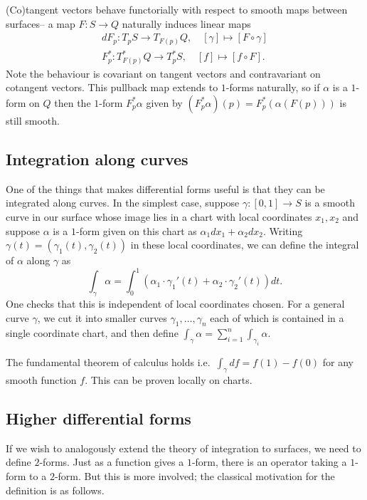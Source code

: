 (Co)tangent vectors behave functorially with respect to smooth maps between
surfaces-- a map \(F:S\to Q\) naturally induces linear maps
\begin{align*}
    dF_p: T_pS \to T_{F(p)}Q, \quad [\gamma] \mapsto [F\circ \gamma] \\
    F_p^\ast:T^\ast_{F(p)}Q \to T^\ast_pS, \quad [f]\mapsto [f\circ F].
\end{align*}
Note the behaviour is covariant on tangent vectors and contravariant on
cotangent vectors. This pullback map extends to \(1\)-forms naturally, so if
\(\alpha\) is a \(1\)-form on \(Q\) then the \(1\)-form \(F_p^\ast \alpha\) given
by \((F_p^\ast\alpha)(p)= F_p^\ast(\alpha(F(p)))\) is still smooth.

\subsection{Integration along curves}
One of the things that makes differential forms useful is that they can be
integrated along curves. In the simplest case, suppose \(\gamma:[0,1]\to
S\) is a smooth curve in our surface whose image lies in a chart with local
coordinates \(x_1,x_2\) and suppose \(\alpha\) is a
\(1\)-form given on this chart as \(\alpha_1dx_1+\alpha_2dx_2\). Writing
\(\gamma(t)=(\gamma_1(t),\gamma_2(t))\) in these local coordinates, we can
define the integral of \(\alpha\) along \(\gamma\) as
\[
    \int_\gamma \alpha = \int_0^1(\alpha_1\cdot
    \gamma_1'(t)+\alpha_2\cdot \gamma_2'(t))dt.
\]
One checks that this is independent of local coordinates chosen. For a general
curve \(\gamma\), we cut it into smaller curves \(\gamma_1,\ldots,\gamma_n\) each
of which is contained in a single coordinate chart, and then define
\(\int_\gamma \alpha = \sum_{i=1}^n \int_{\gamma_i}\alpha\).

The fundamental theorem of calculus holds i.e.\ \(\int_\gamma df =
f(1)-f(0)\) for any smooth function \(f\). This can be proven locally on charts.

\subsection{Higher differential forms} If we wish to analogously extend the
theory of integration to surfaces, we need to define \(2\)-forms. Just as a
function gives a \(1\)-form, there is an operator taking a \(1\)-form to a
\(2\)-form.  But this is more involved; the classical motivation for the
definition is as follows.

